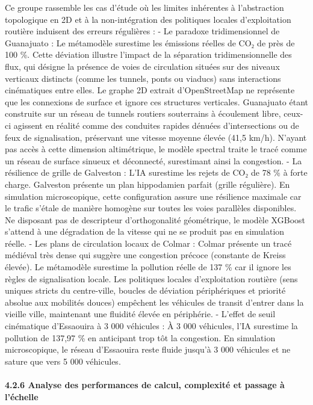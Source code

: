\documentclass[10pt, a4paper]{article}
\begin{document}
Ce groupe rassemble les cas d'étude où les limites inhérentes à
l'abstraction topologique en 2D et à la non-intégration des politiques
locales d'exploitation routière induisent des erreurs régulières : - Le
paradoxe tridimensionnel de Guanajuato : Le métamodèle surestime les
émissions réelles de CO₂ de près de 100 \%. Cette déviation illustre
l'impact de la séparation tridimensionnelle des flux, qui désigne la
présence de voies de circulation situées sur des niveaux verticaux
distincts (comme les tunnels, ponts ou viaducs) sans interactions
cinématiques entre elles. Le graphe 2D extrait d'OpenStreetMap ne
représente que les connexions de surface et ignore ces structures
verticales. Guanajuato étant construite sur un réseau de tunnels
routiers souterrains à écoulement libre, ceux-ci agissent en réalité
comme des conduites rapides dénuées d'intersections ou de feux de
signalisation, préservant une vitesse moyenne élevée (41,5 km/h).
N'ayant pas accès à cette dimension altimétrique, le modèle spectral
traite le tracé comme un réseau de surface sinueux et déconnecté,
surestimant ainsi la congestion. - La résilience de grille de Galveston
: L'IA surestime les rejets de CO₂ de 78 \% à forte charge. Galveston
présente un plan hippodamien parfait (grille régulière). En simulation
microscopique, cette configuration assure une résilience maximale car le
trafic s'étale de manière homogène sur toutes les voies parallèles
disponibles. Ne disposant pas de descripteur d'orthogonalité
géométrique, le modèle XGBoost s'attend à une dégradation de la vitesse
qui ne se produit pas en simulation réelle. - Les plans de circulation
locaux de Colmar : Colmar présente un tracé médiéval très dense qui
suggère une congestion précoce (constante de Kreiss élevée). Le
métamodèle surestime la pollution réelle de 137 \% car il ignore les
règles de signalisation locale. Les politiques locales d'exploitation
routière (sens uniques stricts du centre-ville, boucles de déviation
périphériques et priorité absolue aux mobilités douces) empêchent les
véhicules de transit d'entrer dans la vieille ville, maintenant une
fluidité élevée en périphérie. - L'effet de seuil cinématique
d'Essaouira à 3 000 véhicules : À 3 000 véhicules, l'IA surestime la
pollution de 137,97 \% en anticipant trop tôt la congestion. En
simulation microscopique, le réseau d'Essaouira reste fluide jusqu'à 3
000 véhicules et ne sature que vers 5 000 véhicules.

\paragraph{4.2.6 Analyse des performances de calcul, complexité et
passage à
l'échelle}\label{analyse-des-performances-de-calcul-complexituxe9-et-passage-uxe0-luxe9chelle}
\end{document}
